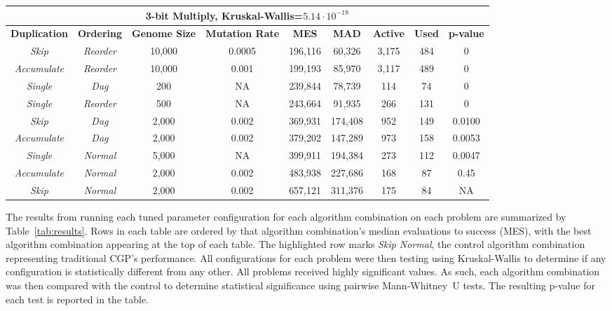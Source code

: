 \documentclass[journal]{IEEEtran}
\begin{document}
\begin{table*}
\begin{tabular}{|c|c|c|c|c|c|c|c|c|}
	  \multicolumn{9}{|c|}{\textbf{3-bit Multiply}, Kruskal-Wallis=$5.14\cdot 10^{-18}$} \\ \hline

\textbf{Duplication} & \textbf{Ordering} & \textbf{Genome Size} & \textbf{Mutation Rate} & \textbf{MES} & \textbf{MAD} & \textbf{Active} & \textbf{Used} & \textbf{p-value} \\ \hline
\emph{Skip} & \emph{Reorder}      & 10,000 & 0.0005  & 196,116  & 60,326  & 3,175 & 484 & 0  \\ \hline
\emph{Accumulate} & \emph{Reorder}& 10,000 & 0.001 & 199,193 & 85,970 & 3,117 & 489 & 0  \\ \hline
\emph{Single} & \emph{Dag} & 200  & NA & 239,844 & 78,739 & 114 & 74 & 0 \\ \hline
\emph{Single} & \emph{Reorder}    & 500   & NA & 243,664 & 91,935 & 266 & 131 & 0 \\ \hline
\emph{Skip} & \emph{Dag}          & 2,000 & 0.002 & 369,931 & 174,408 & 952 & 149 & 0.0100 \\ \hline
\emph{Accumulate} & \emph{Dag}    & 2,000 & 0.002  & 379,202 & 147,289 & 973 & 158 & 0.0053  \\ \hline
\emph{Single} & \emph{Normal}     & 5,000  & NA & 399,911 & 194,384 & 273 & 112 & 0.0047 \\ \hline
\emph{Accumulate} & \emph{Normal} & 2,000 & 0.002 & 483,938 & 227,686 & 168 & 87 & 0.45 \\ \hline
\rowcolor{Gray}
\emph{Skip} & \emph{Normal} & 2,000 & 0.002 & 657,121 & 311,376 & 175 & 84 & NA \\ \hline

	\end{tabular}
	\caption{Results for algorithm configuration on each problem.  Highlighted row
	is the control configuration \emph{Skip Normal}.  MES=Median Evaluations to Success; MAD=Median
	Absolute Deviation; p-value=Result from Mann-Whitney~U comparison with control.
	}
	\label{tab:results}
\end{table*}

The results from running each tuned parameter configuration for each algorithm
combination on each problem are summarized by Table~\ref{tab:results}.
Rows in each table are ordered by that algorithm combination's median evaluations to
success (MES), with the best algorithm combination appearing at the top of each table.
The highlighted row marks \emph{Skip Normal}, the control algorithm combination
representing traditional CGP's performance.  All configurations for each problem
were then testing using Kruskal-Wallis to determine if any configuration is
statistically different from any other.  All problems received highly significant
values.  As such, each algorithm combination was then compared with the control
to determine statistical significance using pairwise Mann-Whitney~U tests. The
resulting p-value for each test is reported in the table.
\end{document}

